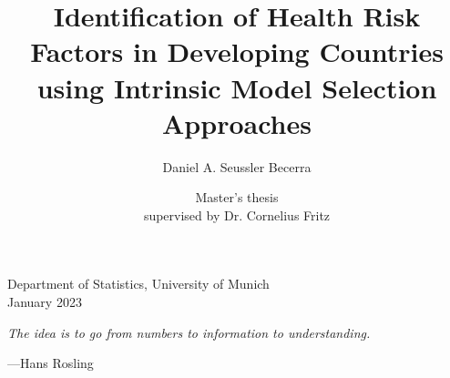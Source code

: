 \documentclass[11pt, a4paper, twoside]{article}
\title{Identification of Health Risk Factors in Developing Countries using Intrinsic Model Selection Approaches}
\author{Daniel A. Seussler Becerra \orcidlink{0000-0002-1683-1779}}
\date{Master's thesis\\supervised by Dr. Cornelius Fritz}
\begin{document}
\maketitle
\vspace{1cm}

\vfill

\begin{center}
	Department of Statistics, University of Munich\\
    January 2023
\end{center}
\vfill

\thispagestyle{empty}

\cleardoublepage
\epigraph{\itshape The idea is to go from numbers to information to understanding.}{---Hans Rosling}

\cleardoublepage
\setcounter{tocdepth}{2}
\tableofcontents

\makeatletter
\def\footnoterule{\relax%
	\kern-5pt
	\hbox to \columnwidth{\hfill\vrule width 0.5\columnwidth height 0.4pt\hfill}
	\kern4.6pt}
\makeatother

\cleardoublepage
{}
\singlespacing


\newpage
\printbibliography[title=References, heading=bibintoc]

\cleardoublepage
\begin{refsection}

\printbibliography[title=References]
\end{refsection}

\cleardoublepage

\end{document}
